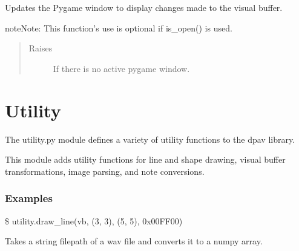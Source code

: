 \documentclass[letterpaper,10pt,english,openany,oneside]{sphinxmanual}
\begin{document}
\begin{fulllineitems}
\begin{fulllineitems}
\begin{quote}
\begin{description}
\end{description}\end{quote}

\end{fulllineitems}



\begin{fulllineitems}

\pysigstartsignatures
{}
\pysigstopsignatures
\sphinxAtStartPar
Updates the Pygame window to display changes made to the visual buffer.

\begin{sphinxadmonition}{note}{Note:}
\sphinxAtStartPar
This function’s use is optional if is\_open() is used.
\end{sphinxadmonition}
\begin{quote}\begin{description}
\item[{Raises}] \leavevmode
\sphinxAtStartPar
{} \textendash{} If there is no active pygame window.

\end{description}\end{quote}

\end{fulllineitems}


\end{fulllineitems}



\section{Utility}
\label{\detokenize{dpav:utility}}
\sphinxAtStartPar
The utility.py module defines a variety of utility functions to the dpav library.

\sphinxAtStartPar
This module adds utility functions for line and shape drawing, visual buffer
transformations, image parsing, and note conversions.
\subsubsection*{Examples}

\sphinxAtStartPar
\$ utility.draw\_line(vb, (3, 3), (5, 5), 0x00FF00)


\begin{fulllineitems}

\pysigstartsignatures
{}
\pysigstopsignatures
\sphinxAtStartPar
Takes a string filepath of a wav file and converts it to a numpy array.

\end{fulllineitems}
\end{document}
